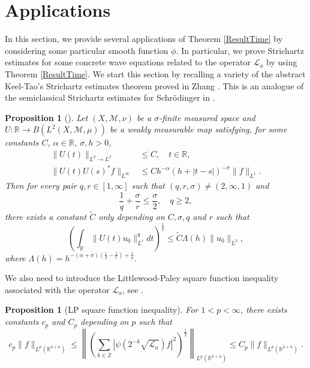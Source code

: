 \documentclass[a4paper,11pt, reqno]{amsart}
\numberwithin{equation}{section}
\theoremstyle{plain}
\newtheorem{proposition}[theorem]{Proposition}
\theoremstyle{definition}
\theoremstyle{remark}
\begin{document}
\section{Applications}\label{sec5}
In this section, we provide several applications of Theorem \ref{ResultTime} by considering some particular smooth function $\phi$. In particular, we prove Strichartz estimates for some concrete wave equations related to the operator $\mathcal{L}_a$ by using Theorem \ref{ResultTime}. We start this section by recalling a variety of the abstract Keel-Tao's Strichartz estimates theorem proved in Zhang \cite{Zhang2019}. This is an analogue of the semiclassical Strichartz estimates for Schr\"odinger in \cite{Koch-Tataru-Zworski, Zworski}.
\begin{proposition}[\cite{Zhang2019}]\label{Keel-Tao argument} Let $(X,\mathcal{M},\nu)$ be a $\sigma$-finite measured space and $U: \mathbb{R}\rightarrow B(L^2(X,\mathcal{M},\mu))$ be a weakly measurable map satisfying, for some constants $C$, $\alpha\in\mathbb{R}$, $\sigma,h>0$,
\begin{align}
\|U(t)\|_{L^2\rightarrow L^2}&\leq C,\quad t\in\mathbb{R},\label{energy estimate}\\
\|U(t)U(s)^*f\|_{L^\infty}&\leq Ch^{-\alpha}(h+|t-s|)^{-\sigma}\|f\|_{L^1}.\label{1 to infty}
\end{align}
Then for every pair $q,r\in[1,\infty]$ such that $(q,r,\sigma)\neq (2,\infty,1)$ and
\begin{equation*}
\frac{1}{q}+\frac{\sigma}{r}\leq\frac{\sigma}{2}, \quad q\geq2,
\end{equation*}
there exists a constant $\widetilde{C}$ only depending on $C,\sigma, q$ and $r$ such that
\begin{equation*}
\left(\int_\mathbb{R} \|U(t)u_0\|^q_{L^r}dt\right)^\frac{1}{q}\leq \widetilde{C}\Lambda(h)\|u_0\|_{L^2},
\end{equation*}
where $\Lambda(h)=h^{-(\alpha+\sigma)(\frac{1}{2}-\frac{1}{r})+\frac{1}{q}}$.
\end{proposition}
We also need to introduce the Littlewood-Paley square function inequality associated with the operator $\mathcal{L}_a$, see \cite{Zhang-Zhang}.
\begin{proposition}[LP square function inequality]\label{LP inequality} For $1<p<\infty$, there exists constants $c_p$ and $C_p$ depending on $p$ such that
\begin{equation*}
c_p\|f\|_{L^p(\mathbb{R}^{2+n})}\leq \left\|\left(\sum_{k\in\mathbb{Z}}|\psi(2^{-k}\sqrt{\mathcal{L}_a})f|^2\right)^\frac{1}{2}\right\|_{L^p(\mathbb{R}^{2+n})}\leq C_p\|f\|_{L^p(\mathbb{R}^{2+n})}.
\end{equation*}
\end{proposition}
 
\end{document}
